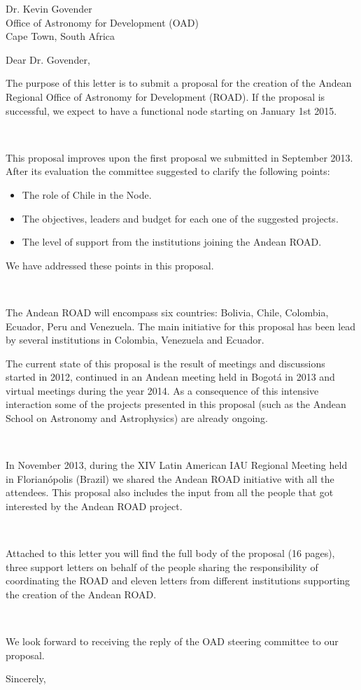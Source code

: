 \documentclass[a4paper,DIN]{scrlttr2}
\begin{document}
\begin{letter}{%
Dr. Kevin Govender\\
Office of Astronomy for Development (OAD)\\
Cape Town, South Africa
}

\opening{Dear Dr. Govender,}


The purpose of this letter is to submit a proposal for the creation of
the Andean Regional Office of Astronomy for Development (ROAD). If the
proposal is successful, we expect to have a functional node starting
on January 1st 2015.

\

\noindent
This proposal improves upon the first proposal we submitted in
September 2013.  After its evaluation the committee suggested to clarify the
following points:

\begin{itemize}
\item The role of Chile in the Node. 
\item The objectives, leaders and budget for each one of the suggested
  projects.
\item The level of support from the institutions joining the
  Andean ROAD.
\end{itemize} 

\noindent
We have addressed these points in this proposal.

\

\noindent
The Andean ROAD will encompass six countries: Bolivia, Chile, Colombia,
Ecuador, Peru and Venezuela. The main initiative for this proposal has
been lead by several institutions in Colombia, Venezuela and
Ecuador. 

\noindent
The current state of this proposal is the result of meetings
and discussions started in 2012, continued in an Andean meeting held
in Bogot\'a in 2013 and virtual meetings during the year 2014. As a
consequence of this intensive interaction some of
the projects presented in this proposal (such as the Andean School on
Astronomy and Astrophysics) are already ongoing.


\

\noindent
In November 2013, during the XIV Latin American IAU Regional Meeting
held in Florian\'opolis (Brazil) we shared the Andean ROAD initiative
with all the attendees. This proposal also includes the input from all
the people that got interested by the Andean ROAD project. 

\

\noindent
Attached to this letter you will find the full body of the proposal
(16 pages), three support letters on behalf of the people sharing
the responsibility of coordinating the ROAD and  eleven letters from
different institutions supporting the creation of the Andean ROAD.

\

\noindent
We look forward to receiving the reply of the OAD steering committee
to our proposal.


\closing{Sincerely,}

\vspace{-1cm}
\end{letter}
\end{document}
